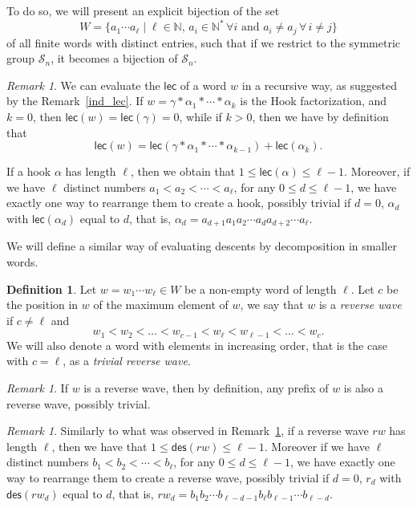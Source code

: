 \documentclass[a4paper]{amsart}
\newcommand{\des}{\mathsf{des}}
\newcommand{\lec}{\mathsf{lec}}
\theoremstyle{definition}
\newtheorem{definition}[theorem]{Definition}
\theoremstyle{remark}
\newtheorem{remark}[theorem]{Remark}
\numberwithin{equation}{section}
\begin{document}
To do so, we will present an explicit bijection of the set $$W=\{a_1\cdots a_{\ell}\mid \ell\in\mathbb{N},\,a_i\in\mathbb{N}^*\,\forall i\text{ and }a_i\neq a_j\,\forall\, i\neq j\}$$ of all finite words with distinct entries, such that if we restrict to the symmetric group $\mathcal{S}_n$, it becomes a bijection of $\mathcal{S}_n$. 

\begin{remark} \label{lec_inverse}
We can evaluate the $\lec$ of a word $w$ in a recursive way, as suggested by the Remark~\ref{ind_lec}. If $w=\gamma*\alpha_1*\cdots*\alpha_k$ is the Hook factorization, and $k=0$, then $\lec(w)=\lec(\gamma)=0$, while if $k>0$, then we have by definition that
\begin{equation}
    \lec(w)=\lec(\gamma*\alpha_1*\cdots*\alpha_{k-1})+\lec(\alpha_k).
\end{equation}

If a hook $\alpha$ has length $\ell$, then we obtain that $1\leq\lec(\alpha)\leq\ell-1$. Moreover, if we have $\ell$ distinct numbers $a_1<a_2<\cdots<a_{\ell}$, for any $0\leq d\leq\ell-1$, we have exactly one way to rearrange them to create a hook, possibly trivial if $d=0$,  $\alpha_d$ with $\lec(\alpha_d)$ equal to $d$, that is, $\alpha_d=a_{d+1}a_1a_2\cdots a_da_{d+2}\cdots a_{\ell}$.
\end{remark}

We will define a similar way of evaluating descents by decomposition in smaller words.

\begin{definition}
    Let $w=w_1\cdots w_{\ell}\in W$ be a non-empty word of length $\ell$. Let $c$ be the position in $w$ of the maximum element of $w$, we say that $w$ is a \textit{reverse wave} if $c\neq\ell$ and 
    \begin{equation}
    w_1<w_2<\dots<w_{c-1}<w_{\ell}<w_{\ell-1}<\dots<w_c.
    \end{equation}
    We will also denote a word with elements in increasing order, that is the case with $c=\ell$, as a \textit{trivial reverse wave}.
\end{definition}

\begin{remark}\label{rem:pref_rw}
    If $w$ is a reverse wave, then by definition, any prefix of $w$ is also a reverse wave, possibly trivial.
\end{remark}

\begin{remark}\label{rem:unique_rwave}
Similarly to what was observed in Remark~\ref{lec_inverse}, if a reverse wave $rw$ has length $\ell $, then we have that $1\leq\des(rw)\leq\ell-1$. Moreover if we have $\ell$ distinct numbers $b_1<b_2<\cdots<b_{\ell}$, for any $0\leq d\leq\ell-1$, we have exactly one way to rearrange them to create a reverse wave, possibly trivial if $d=0$, $r_d$ with $\des(rw_d)$ equal to $d$, that is, ${rw_d=b_1b_2\cdots b_{\ell-d-1}b_{\ell}b_{\ell-1}\cdots b_{\ell-d}}$.
\end{remark}
\end{document}
